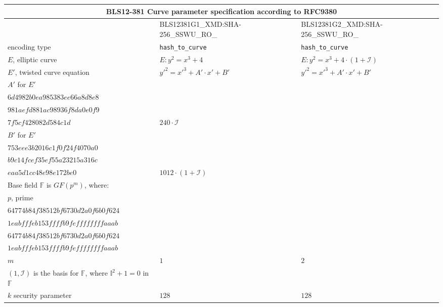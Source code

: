 \begin{table}[h]
	\centering
	\begin{tabular}{ |p{3cm}||p{6cm}|p{6cm}|  }
		\hline
		\multicolumn{3}{|c|}{ \textbf{BLS12-381 Curve parameter specification according to RFC9380} } \\
		\hline
		& BLS12381G1\_XMD:SHA-256\_SSWU\_RO\_ & BLS12381G2\_XMD:SHA-256\_SSWU\_RO\_ \\
		\hline
		encoding type	& \lstinline|hash_to_curve| & \lstinline|hash_to_curve| \\
		$E$, elliptic curve	& $E: y^2=x^3 +4$ &  $E: y^2=x^3 +4 \cdot (1 + \mathcal{I})$ \\
		$E'$, twisted curve equation & ${y'}^2 = {x'}^3+ A' \cdot x' + B'$ & ${y'}^2 = {x'}^3+ A' \cdot x' + B'$ \\
		$A'$ for $E'$	& 
		\makecell[l]{
			\texttt{$0x144698a3b8e9433d693a02c9$}\\
			\texttt{$6d4982b0ea985383ee66a8d8e8$}\\
			\texttt{$981aefd881ac98936f8da0e0f9$}\\
			\texttt{$7f5cf428082d584c1d$}
		}\vspace{12pt}
		& $240 \cdot \mathcal{I}$ \\
		$B'$ for $E'$	& \makecell[l]{
			\texttt{$0x12e2908d11688030018b12e8$}\\
			\texttt{$753eee3b2016c1f0f24f4070a0$}\\
			\texttt{$b9c14fcef35ef55a23215a316c$}\\
			\texttt{$eaa5d1cc48e98e172be0$}
		} & $1012 \cdot (1+\mathcal{I})$ \\
		Base field $\mathbb{F}$ is $GF(p^m)$, where:		& & \\
		$p$, prime	& \makecell[l]{
			\texttt{$0x1a0111ea397fe69a4b1ba7b6434bacd7$}\\
			\texttt{$64774b84f38512bf6730d2a0f6b0f624$}\\
			\texttt{$1eabfffeb153ffffb9feffffffffaaab$}
		} &\makecell[l]{
			\texttt{$0x1a0111ea397fe69a4b1ba7b6434bacd7$}\\
			\texttt{$64774b84f38512bf6730d2a0f6b0f624$}\\
			\texttt{$1eabfffeb153ffffb9feffffffffaaab$}
		} \\
		$m$	& $1$ &  $2$ \\
		$(1, \mathcal{I})$ is the basis for $\mathbb{F}$, where $\mathbb{I}^2 + 1 = 0$ in $\mathbb{F}$		& & \\
		$k$ security parameter	& $128$ &  $128$ \\

\end{tabular}
\end{table}
